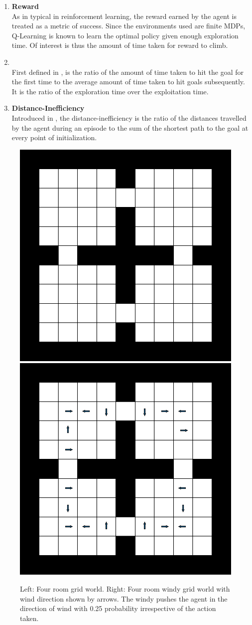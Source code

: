 \begin{enumerate}
    \item \textbf{Reward}\\\noindent
        As in typical in reinforcement learning, the reward earned by
        the agent is treated as a metric of success. Since the
        environments used are finite MDPs, Q-Learning is known to learn
        the optimal policy given enough exploration time. Of interest is
        thus the amount of time taken for reward to climb.

    \item \textbf{\Loo}\\
        First defined in \cite{MiPaViICLR2017}, \Loo is the ratio of the
        amount of time taken to hit the goal for the first time to the
        average amount of time taken to hit goals subsequently. It is
        the ratio of the exploration time over the exploitation time. 

    \item \textbf{Distance-Inefficiency}\\
        Introduced in \cite{dhiman2018critical}, the
        distance-inefficiency is the ratio of the distances travelled by
        the agent during an episode to the sum of the shortest path to
        the goal at every point of initialization. 
\end{enumerate}


%
\begin{figure}[h!]%
\includegraphics[width=0.48\columnwidth]{media/4-room-grid-world.pdf}
\hfill
\includegraphics[width=0.48\columnwidth]{media/4-room-windy-world.pdf}%
\caption{Left: Four room grid world. Right: Four room windy grid world with wind direction shown by arrows. The windy pushes the agent in the direction of wind with 0.25 probability irrespective of the action taken.}
\label{fig:four-room-grid-world}%
\end{figure}%

